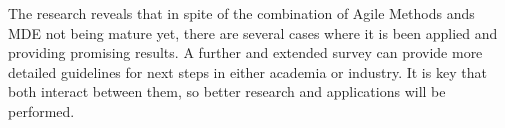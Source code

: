\documentclass[10pt, a4paper, twocolumn]{article}
\begin{document}
The research reveals that in spite of the combination of Agile Methods ands MDE not being mature yet, there are several cases where it is been applied and providing promising results. A further and extended survey can provide more detailed guidelines for next steps in either academia or industry. It is key that both interact between them, so better research and applications will be performed.





\end{document}
